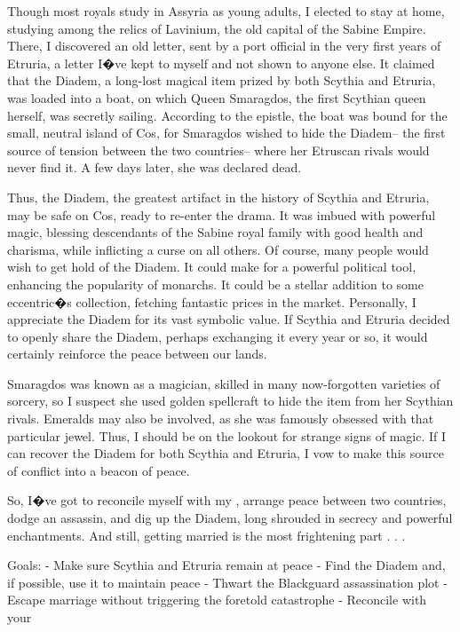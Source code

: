 \documentclass[char]{Kos}
\begin{document}
Though most royals study in Assyria as young adults, I elected to stay at home, studying among the relics of Lavinium, the old capital of the Sabine Empire. There, I discovered an old letter, sent by a port official in the very first years of Etruria, a letter I�ve kept to myself and not shown to anyone else. It claimed that the Diadem, a long-lost magical item prized by both Scythia and Etruria, was loaded into a boat, on which Queen Smaragdos, the first Scythian queen herself, was secretly sailing. According to the epistle, the boat was bound for the small, neutral island of Cos, for Smaragdos wished to hide the Diadem-- the first source of tension between the two countries-- where her Etruscan rivals would never find it. A few days later, she was declared dead.

Thus, the Diadem, the greatest artifact in the history of Scythia and Etruria, may be safe on Cos, ready to re-enter the drama. It was imbued with powerful magic, blessing descendants of the Sabine royal family with good health and charisma, while inflicting a curse on all others. Of course, many people would wish to get hold of the Diadem. It could make for a powerful political tool, enhancing the popularity of monarchs. It could be a stellar addition to some eccentric�s collection, fetching fantastic prices in the market. Personally, I appreciate the Diadem for its vast symbolic value. If Scythia and Etruria decided to openly share the Diadem, perhaps exchanging it every year or so, it would certainly reinforce the peace between our lands.

Smaragdos was known as a magician, skilled in many now-forgotten varieties of sorcery, so I suspect she used golden spellcraft to hide the item from her Scythian rivals. Emeralds may also be involved, as she was famously obsessed with that particular jewel. Thus, I should be on the lookout for strange signs of magic. If I can recover the Diadem for both Scythia and Etruria, I vow to make this source of conflict into a beacon of peace. 

So, I�ve got to reconcile myself with my \cPoet{\sibling}, arrange peace between two countries, dodge an assassin, and dig up the Diadem, long shrouded in secrecy and powerful enchantments. And still, getting married is the most frightening part . . .

Goals:
- Make sure Scythia and Etruria remain at peace
- Find the Diadem and, if possible, use it to maintain peace
- Thwart the Blackguard assassination plot 
- Escape marriage without triggering the foretold catastrophe
- Reconcile with your \cPoet{\sibling}
\end{document}
